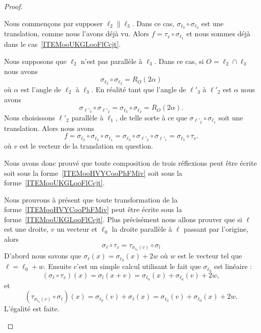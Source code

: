 \begin{proof}
\begin{subproof}
            Nous commençons par supposer \( \ell_2\parallel\ell_3\). Dans ce cas, \( \sigma_{\ell_3}\circ\sigma_{\ell_2}\) est une translation, comme nous l'avons déjà vu. Alors \( f= \tau_v\circ\sigma_{\ell_1}\) et nous sommes déjà dans le cas~\ref{ITEMooUKGLooFlCcjt}.

            Nous supposons que \( \ell_2\) n'est pas parallèle à \( \ell_3\). Dans ce cas, si \( O=\ell_2\cap\ell_3\) nous avons
            \begin{equation}
                \sigma_{\ell_3}\circ\sigma_{\ell_2}=R_O(2\alpha)
            \end{equation}
            où \( \alpha\) est l'angle de \( \ell_2\) à \( \ell_3\). En réalité tant que l'angle de \( \ell'_3\) à \( \ell'_2\) est \( \alpha\) nous avons
            \begin{equation}
                \sigma_{\ell'_3}\circ\sigma_{\ell'_2}= \sigma_{\ell_3}\circ\sigma_{\ell_2}=R_O(2\alpha).
            \end{equation}
            Nous choisissons \( \ell'_2\) parallèle à \( \ell_1\), de telle sorte à ce que \( \sigma_{\ell'_2}\circ\sigma_{\ell_1}\) soit une translation. Alors nous avons
            \begin{equation}
                f=\sigma_{\ell_3}\circ\sigma_{\ell_2}\circ\sigma_{\ell_1}=\sigma_{\ell_3}\circ\sigma_{\ell'_2}\circ\sigma_{\ell'_1}=\sigma_{\ell_3}\circ\tau_v.
            \end{equation}
            où \( v\) est le vecteur de la translation en question.

            Nous avons donc prouvé que toute composition de trois réflexions peut être écrite soit sous la forme~\ref{ITEMooHVYCooPhFMiv} soit sous la forme~\ref{ITEMooUKGLooFlCcjt}.

            Nous prouvons à présent que toute transformation de la forme~\ref{ITEMooHVYCooPhFMiv} peut être écrite sous la forme~\ref{ITEMooUKGLooFlCcjt}. Plus précisément nous allons prouver que si \( \ell\) est une droite, \( v\) un vecteur et \( \ell_0\) la droite parallèle à \( \ell\) passant par l'origine, alors
            \begin{equation}
                \sigma_{\ell}\circ\tau_v=\tau_{\sigma_{\ell_0}(v)}\circ\sigma_l
            \end{equation}
            D'abord nous savons que \( \sigma_{\ell}(x)=\sigma_{\ell_0}(x)+2w\) où \( w\) est le vecteur tel que \( \ell=\ell_0+w\). Ensuite c'est un simple calcul utilisant le fait que \( \sigma_{\ell_0}\) est linéaire :
            \begin{equation}
                (\sigma_{\ell}\circ\tau_v)(x)=\sigma_l(x+v)=\sigma_{\ell_0}(x)+\sigma_{\ell_0}(v)+2w,
            \end{equation}
            et
            \begin{equation}
                (\tau_{\sigma_{\ell_0}(v)}\circ\sigma_{\ell})(x)=\sigma_{\ell_0}(v)+\sigma_{\ell}(x)=\sigma_{\ell_0}(v)+\sigma_{\ell_0}(x)+2w.
            \end{equation}
            L'égalité est faite.


\end{subproof}
\end{proof}
